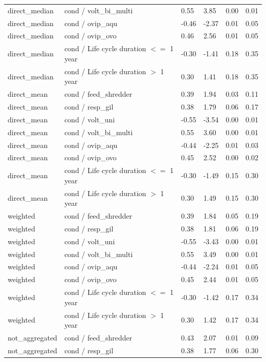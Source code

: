 \documentclass[12pt]{article}
\begin{document}
\begin{longtable}[H]{m{2.6cm}|m{7.3cm}|m{1cm}|m{1.4cm}|m{1.5cm}|m{1.5cm}}
      direct\_median & cond / volt\_bi\_multi & 0.55 & 3.85 & 0.00 & 0.01 \\ 
      direct\_median & cond / ovip\_aqu & -0.46 & -2.37 & 0.01 & 0.05 \\ 
      direct\_median & cond / ovip\_ovo & 0.46 & 2.56 & 0.01 & 0.05 \\ 
      direct\_median & cond / Life cycle duration $<=$ 1 year & -0.30 & -1.41 & 0.18 & 0.35 \\ 
      direct\_median & cond / Life cycle duration $>$ 1 year & 0.30 & 1.41 & 0.18 & 0.35 \\ 
      direct\_mean & cond / feed\_shredder & 0.39 & 1.94 & 0.03 & 0.11 \\ 
      direct\_mean & cond / resp\_gil & 0.38 & 1.79 & 0.06 & 0.17 \\ 
      direct\_mean & cond / volt\_uni & -0.55 & -3.54 & 0.00 & 0.01 \\ 
      direct\_mean & cond / volt\_bi\_multi & 0.55 & 3.60 & 0.00 & 0.01 \\ 
      direct\_mean & cond / ovip\_aqu & -0.44 & -2.25 & 0.01 & 0.03 \\ 
      direct\_mean & cond / ovip\_ovo & 0.45 & 2.52 & 0.00 & 0.02 \\ 
      direct\_mean & cond / Life cycle duration $<=$ 1 year & -0.30 & -1.49 & 0.15 & 0.30 \\ 
      direct\_mean & cond / Life cycle duration $>$ 1 year & 0.30 & 1.49 & 0.15 & 0.30 \\ 
      weighted & cond / feed\_shredder & 0.39 & 1.84 & 0.05 & 0.19 \\ 
      weighted & cond / resp\_gil & 0.38 & 1.81 & 0.06 & 0.19 \\ 
      weighted & cond / volt\_uni & -0.55 & -3.43 & 0.00 & 0.01 \\ 
      weighted & cond / volt\_bi\_multi & 0.55 & 3.49 & 0.00 & 0.01 \\ 
      weighted & cond / ovip\_aqu & -0.44 & -2.24 & 0.01 & 0.05 \\ 
      weighted & cond / ovip\_ovo & 0.45 & 2.44 & 0.01 & 0.05 \\ 
      weighted & cond / Life cycle duration $<=$ 1 year & -0.30 & -1.42 & 0.17 & 0.34 \\ 
      weighted & cond / Life cycle duration $>$ 1 year & 0.30 & 1.42 & 0.17 & 0.34 \\ 
      not\_aggregated & cond / feed\_shredder & 0.43 & 2.07 & 0.01 & 0.09 \\ 
      not\_aggregated & cond / resp\_gil & 0.38 & 1.77 & 0.06 & 0.30 \\ 

\end{longtable}
\end{document}
